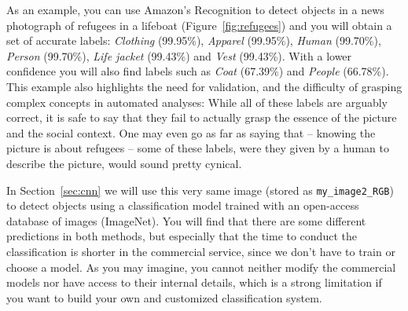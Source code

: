 As an example, you can use Amazon's Recognition to detect objects in a news photograph of refugees in a lifeboat (Figure~\ref{fig:refugees}) and you will obtain a set of accurate labels: \textit{Clothing} (99.95\%), \textit{Apparel} (99.95\%), \textit{Human} (99.70\%), \textit{Person} (99.70\%), \textit{Life jacket} (99.43\%) and \textit{Vest} (99.43\%). With a lower confidence you will also find labels such as \textit{Coat} (67.39\%) and \textit{People} (66.78\%). This example also highlights the need for validation, and the difficulty of grasping complex concepts in automated analyses: While all of these labels are arguably correct, it is safe to say that they fail to actually grasp the essence of the picture and the social context. One may even go as far as saying that -- knowing the picture is about refugees -- some of these labels, were they given by a human to describe the picture, would sound pretty cynical.

In Section~\ref{sec:cnn} we will use this very same image (stored as \texttt{my\_image2\_RGB}) to detect objects using a classification model trained with an open-access database of images (ImageNet). You will find that there are some different predictions in both methods, but especially that the time to conduct the classification is shorter in the commercial service, since we don't have to train or choose a model. As you may imagine, you cannot neither modify the commercial models nor have access to their internal details, which is a strong limitation if you want to build your own and customized classification system.
